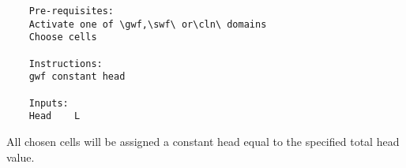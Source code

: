     \begin{verbatim}
    Pre-requisites:
    Activate one of \gwf,\swf\ or\cln\ domains
    Choose cells

    Instructions:
    gwf constant head

    Inputs:
    Head    L
    \end{verbatim}

    All chosen cells will be assigned a constant head equal to the specified total head value.  